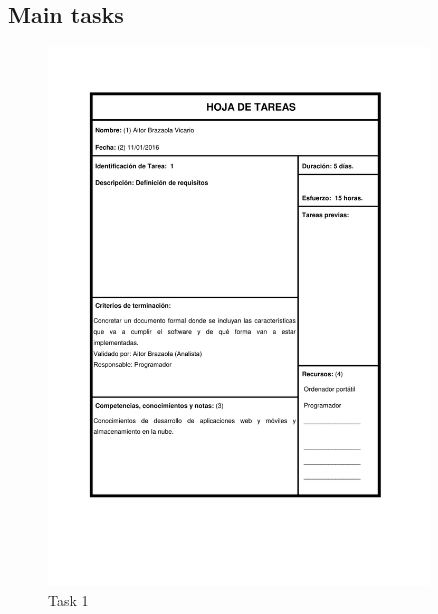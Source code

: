 \documentclass{DeustoFDP}
\begin{document}
\subsection{Main tasks}
\begin{figure}[H]
	\centering
	\includegraphics[width=0.9\textwidth]{fig/Tareas/1}
	\caption{Task 1}
	\label{fig:t1}
\end{figure}
\end{document}
